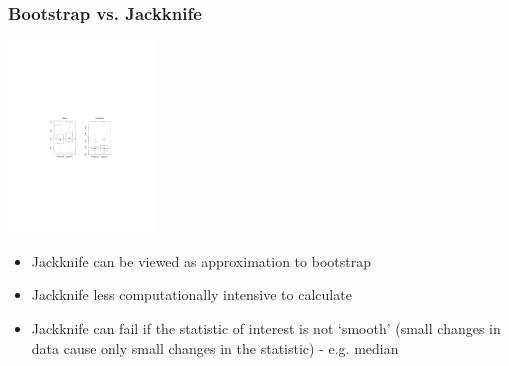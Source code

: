 \documentclass{beamer}
\begin{document}
\begin{frame}
  \frametitle{Bootstrap vs. Jackknife}

\begin{center}
\includegraphics[height=2in]{jack-vs-boot}
\end{center}

\begin{itemize}
    \item Jackknife can be viewed as approximation to bootstrap
    \item Jackknife less computationally intensive to calculate
    \item Jackknife can fail if the statistic of interest is not `smooth' (small changes in data cause only small changes in the statistic) - e.g. median
\end{itemize}

\end{frame}
\end{document}
